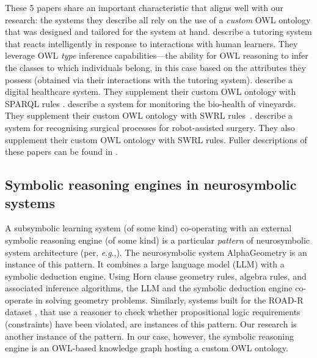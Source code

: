 \documentclass[]{jair}
\newcommand{\eg}{\textit{e}.\textit{g}.,\xspace}
\begin{document}
These 5 papers share an important characteristic that aligns well with our research: the systems they describe all rely on the use of a \emph{custom} OWL ontology that was designed and tailored for the system at hand. 
\citet{DBLP:journals/access/ChangDGOSS20} describe a tutoring system that reacts  intelligently in response to interactions with human learners.
They leverage OWL \emph{type} inference capabilities---the ability for OWL reasoning to infer the classes to which individuals belong, in this case based on the attributes they possess (obtained via their interactions with the tutoring system).
\citet{DBLP:conf/semweb/DonadelloDE19} describe a digital healthcare system.
They supplement their custom OWL ontology with SPARQL rules \cite{Harris-SPARQL-2013}.
\citet{DBLP:conf/wetice/MouakherBBLHN19} describe a system for monitoring the bio-health of vineyards.
They supplement their custom OWL ontology with SWRL rules~\cite{Horrocks-SWRL-2004}.
\citet{DBLP:journals/cars/NakawalaBPCFM19} describe a system for recognising surgical processes for robot-assisted surgery.
They also supplement their custom OWL ontology with SWRL rules.
Fuller descriptions of these papers can be found in \citet{Herron/NAIJournal/2025}.

\subsection{Symbolic reasoning engines in neurosymbolic systems}
A subsymbolic learning system (of some kind) co-operating with an external symbolic reasoning engine (of some kind) is a particular \emph{pattern} of neurosymbolic system architecture (per, \eg \citet{DBLP:journals/jwe/HarmelenT19,DBLP:journals/apin/BekkumBHMT21,Breit-and-Waltersdorfer}).
The neurosymbolic system AlphaGeometry \cite{Trinh2024} is an instance of this pattern.
It combines a large language model (LLM) with a symbolic deduction engine.
Using Horn clause geometry rules, algebra rules, and associated inference algorithms, the LLM and the symbolic deduction engine co-operate in solving geometry problems. 
Similarly, systems built for the ROAD-R dataset \cite{Giunchiglia2023}, that use a reasoner to check whether propositional logic requirements (constraints) have been violated, are instances of this pattern.
Our research is another instance of the pattern.
In our case, however, the symbolic reasoning engine is an OWL-based knowledge graph hosting a custom OWL ontology.
\end{document}
